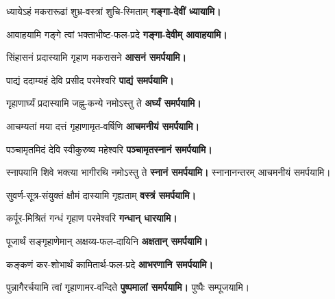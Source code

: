 \addtolength{\shlokavskip}{1ex}

\begin{center}

{ध्यायेऽहं मकरारूढां शुभ्र-वस्त्रां शुचि-स्मिताम्}
\textbf{गङ्गा-देवीं ध्यायामि।}

{आवाहयामि गङ्गे त्वां भक्ताभीष्ट-फल-प्रदे}
\textbf{गङ्गा-देवीम् आवाहयामि।}

{सिंहासनं प्रदास्यामि गृहाण मकरासने }
\textbf{\devAya{} आसनं समर्पयामि।}

{पाद्यं ददाम्यहं देवि प्रसीद परमेश्वरि}
\textbf{\devAya{} पाद्यं समर्पयामि।}

{गृहाणार्घ्यं प्रदास्यामि जह्नु-कन्ये नमोऽस्तु ते}
\textbf{\devAya{} अर्घ्यं समर्पयामि।}

{आचम्यतां मया दत्तं गृहाणामृत-वर्षिणि}
\textbf{\devAya{} आचमनीयं समर्पयामि।}

{पञ्चामृतमिदं देवि स्वीकुरुष्व महेश्वरि}
\textbf{\devAya{} पञ्चामृतस्नानं समर्पयामि।}

{स्नापयामि शिवे भक्त्या भागीरथि नमोऽस्तु ते}
\textbf{\devAya{} स्नानं समर्पयामि।}
स्नानानन्तरम् आचमनीयं समर्पयामि।

{सुवर्ण-सूत्र-संयुक्तं क्षौमं दास्यामि गृह्यताम्}
\textbf{\devAya{} वस्त्रं समर्पयामि।}

{कर्पूर-मिश्रितं गन्धं गृहाण परमेश्वरि}
\textbf{\devAya{} गन्धान् धारयामि।}

{पूजार्थं सङ्गृहाणेमान् अक्षय्य-फल-दायिनि}
\textbf{\devAya{} अक्षतान् समर्पयामि।}

{कङ्कणं कर-शोभार्थं कामितार्थ-फल-प्रदे}
\textbf{\devAya{} आभरणानि समर्पयामि।}

{पुन्नागैरर्चयामि त्वां गृहाणामर-वन्दिते}
\textbf{\devAya{} पुष्पमालां समर्पयामि।}
पुष्पैः सम्पूजयामि।



\end{center}
